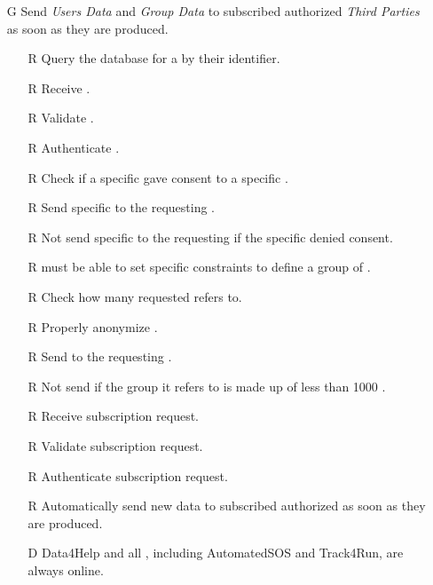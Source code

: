 \documentclass[../../rasd.tex]{subfiles}
\begin{document}
\begin{itemize}
            \item[G\subs{4}]Send \textit{Users Data} and \textit{Group Data} to subscribed authorized \textit{Third Parties} as soon as they are produced.
            \begin{itemize}
                \item[R\subs{7}]Query the database for a  by their identifier.
                \item[R\subs{8}]Receive .
                \item[R\subs{9}]Validate .
                \item[R\subs{10}]Authenticate .
                \item[R\subs{18}]Check if a specific  gave consent to a specific .
                \item[R\subs{19}]Send specific to the requesting .
                \item[R\subs{20}]Not send specific to the requesting  if the specific  denied consent.
                \item[R\subs{21}] must be able to set specific constraints to define a group of .
                \item[R\subs{22}]Check how many  requested  refers to.
                \item[R\subs{23}]Properly anonymize .
                \item[R\subs{24}]Send  to the requesting .
                \item[R\subs{25}]Not send  if the group it refers to is made up of less than 1000 .
                \item[R\subs{26}]Receive  subscription request.
                \item[R\subs{27}]Validate  subscription request.
                \item[R\subs{28}]Authenticate  subscription request.
                \item[R\subs{29}]Automatically send new data to subscribed authorized  as soon as they are produced.
                \\
                \item[D\subs{9}]Data4Help and all , including AutomatedSOS and Track4Run, are always online.

\end{itemize}
\end{itemize}
\end{document}
